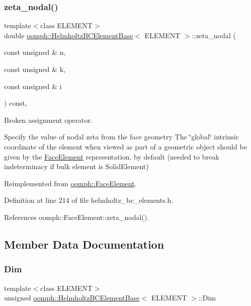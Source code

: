 \subsubsection{\texorpdfstring{zeta\+\_\+nodal()}{zeta\_nodal()}}
{\footnotesize\ttfamily template$<$class E\+L\+E\+M\+E\+NT$>$ \\
double \hyperlink{classoomph_1_1HelmholtzBCElementBase}{oomph\+::\+Helmholtz\+B\+C\+Element\+Base}$<$ E\+L\+E\+M\+E\+NT $>$\+::zeta\+\_\+nodal (\begin{DoxyParamCaption}\item[{const unsigned \&}]{n,  }\item[{const unsigned \&}]{k,  }\item[{const unsigned \&}]{i }\end{DoxyParamCaption}) const\hspace{0.3cm}{\ttfamily [inline]}, {\ttfamily [virtual]}}



Broken assignment operator. 

Specify the value of nodal zeta from the face geometry The \char`\"{}global\char`\"{} intrinsic coordinate of the element when viewed as part of a geometric object should be given by the \hyperlink{classoomph_1_1FaceElement}{Face\+Element} representation, by default (needed to break indeterminacy if bulk element is Solid\+Element) 

Reimplemented from \hyperlink{classoomph_1_1FaceElement_a58c9f93705c7741f76c8487d152e68a6}{oomph\+::\+Face\+Element}.



Definition at line 214 of file helmholtz\+\_\+bc\+\_\+elements.\+h.



References oomph\+::\+Face\+Element\+::zeta\+\_\+nodal().



\subsection{Member Data Documentation}
\mbox{\label{classoomph_1_1HelmholtzBCElementBase_ad01f0d13e7319e28f28286abb6d0b7cc}} 
\subsubsection{\texorpdfstring{Dim}{Dim}}
{\footnotesize\ttfamily template$<$class E\+L\+E\+M\+E\+NT$>$ \\
unsigned \hyperlink{classoomph_1_1HelmholtzBCElementBase}{oomph\+::\+Helmholtz\+B\+C\+Element\+Base}$<$ E\+L\+E\+M\+E\+NT $>$\+::Dim\hspace{0.3cm}{\ttfamily [protected]}}



